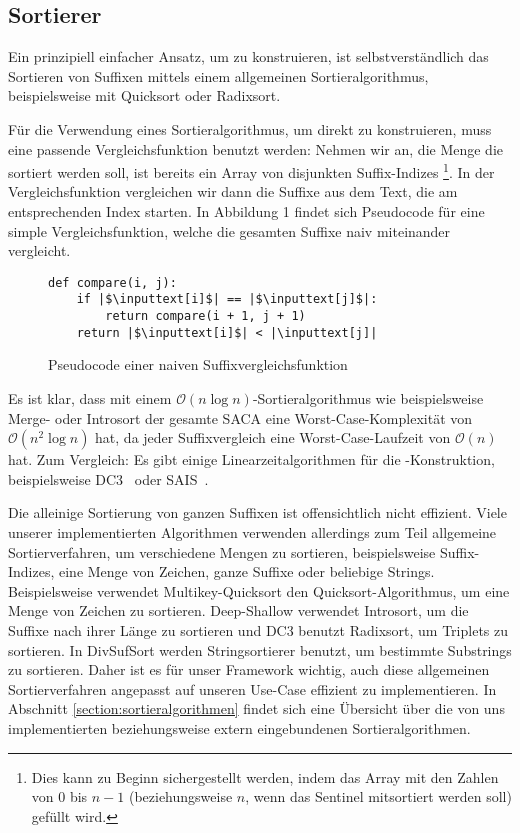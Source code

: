 \subsection{Sortierer}
Ein  prinzipiell einfacher Ansatz, um \sa zu konstruieren,
ist selbstverständlich das Sortieren von Suffixen mittels einem allgemeinen Sortieralgorithmus,
beispielsweise mit Quicksort oder Radixsort.

Für die Verwendung eines Sortieralgorithmus, um \sa direkt zu konstruieren,
muss eine passende Vergleichsfunktion benutzt werden:
Nehmen wir an, die Menge die sortiert werden soll, ist bereits ein Array von disjunkten Suffix-Indizes
\footnote{Dies kann zu Beginn sichergestellt werden, indem das
Array mit den Zahlen von 0 bis $n-1$ (beziehungsweise $n$, wenn das Sentinel mitsortiert werden soll) gefüllt wird.}.
In der Vergleichsfunktion vergleichen wir dann die Suffixe aus dem Text, die am entsprechenden Index starten.
In Abbildung 1 findet sich Pseudocode für eine simple Vergleichsfunktion,
welche die gesamten Suffixe naiv miteinander vergleicht.

\begin{figure}[!ht]
\begin{verbatim}
def compare(i, j):
    if |$\inputtext[i]$| == |$\inputtext[j]$|:
        return compare(i + 1, j + 1)
    return |$\inputtext[i]$| < |\inputtext[j]|
\end{verbatim}
\caption{Pseudocode einer naiven Suffixvergleichsfunktion}
\end{figure}
%
Es ist klar, dass mit einem $\mathcal O(n \log n)$-Sortieralgorithmus wie beispielsweise Merge- oder Introsort
der gesamte SACA eine Worst-Case-Komplexität von\\ $\mathcal O(n^2 \log n)$ hat, da jeder Suffixvergleich
eine Worst-Case-Laufzeit von $\mathcal O(n)$ hat.
Zum Vergleich: Es gibt einige Linearzeitalgorithmen für die \sa-Konstruktion, beispielsweise DC3~\cite{saca:9} oder SAIS~\cite{saca:6}.

Die alleinige Sortierung von ganzen Suffixen ist offensichtlich nicht effizient.
Viele unserer implementierten Algorithmen verwenden allerdings zum Teil allgemeine Sortierverfahren,
um verschiedene Mengen zu sortieren,
beispielsweise Suffix-Indizes, eine Menge von Zeichen, ganze Suffixe oder beliebige Strings.
Beispielsweise verwendet Multikey-Quicksort den Quicksort-Algorithmus, um eine Menge von Zeichen zu sortieren.
Deep-Shallow verwendet Introsort, um die Suffixe nach ihrer Länge zu sortieren
und DC3 benutzt Radixsort, um Triplets zu sortieren.
In DivSufSort werden Stringsortierer benutzt, um bestimmte Substrings zu sortieren.
Daher ist es für unser Framework wichtig, auch diese allgemeinen Sortierverfahren angepasst
auf unseren Use-Case effizient zu implementieren.
In Abschnitt \ref{section:sortieralgorithmen} findet sich eine Übersicht über die von uns
implementierten beziehungsweise extern eingebundenen Sortieralgorithmen.
